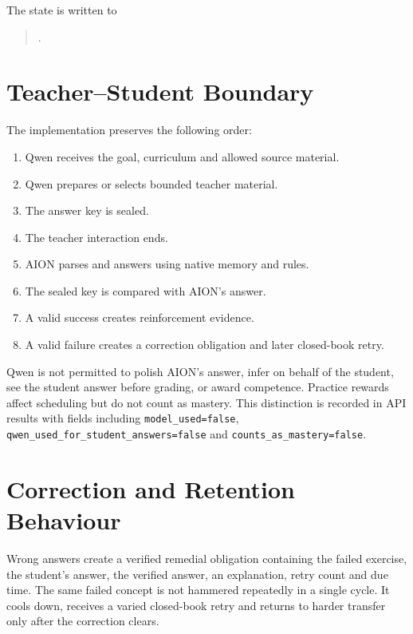 \documentclass[11pt,a4paper]{article}
\begin{document}
The state is written to

\begin{quote}
.
\end{quote}

\section{Teacher--Student Boundary}

The implementation preserves the following order:

\begin{enumerate}
  \item Qwen receives the goal, curriculum and allowed source material.
  \item Qwen prepares or selects bounded teacher material.
  \item The answer key is sealed.
  \item The teacher interaction ends.
  \item AION parses and answers using native memory and rules.
  \item The sealed key is compared with AION's answer.
  \item A valid success creates reinforcement evidence.
  \item A valid failure creates a correction obligation and later closed-book retry.
\end{enumerate}

Qwen is not permitted to polish AION's answer, infer on behalf of the student, see the student
answer before grading, or award competence. Practice rewards affect scheduling but do not count as
mastery. This distinction is recorded in API results with fields including
\texttt{model\_used=false}, \texttt{qwen\_used\_for\_student\_answers=false} and
\texttt{counts\_as\_mastery=false}.

\section{Correction and Retention Behaviour}

Wrong answers create a verified remedial obligation containing the failed exercise, the student's
answer, the verified answer, an explanation, retry count and due time. The same failed concept is
not hammered repeatedly in a single cycle. It cools down, receives a varied closed-book retry and
returns to harder transfer only after the correction clears.
\end{document}
